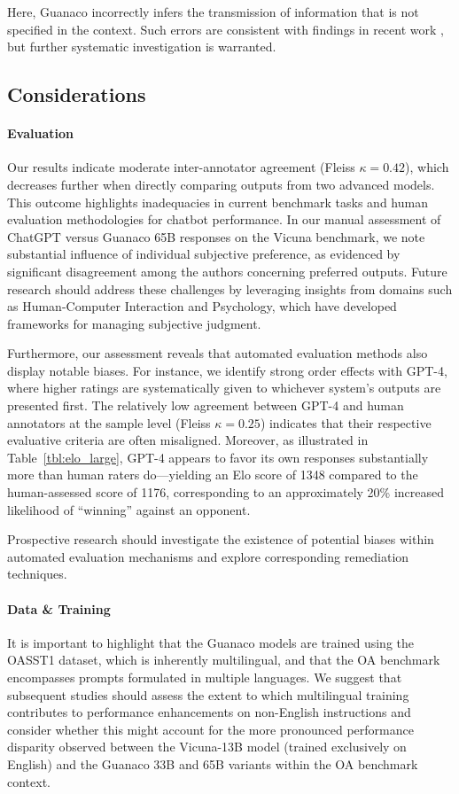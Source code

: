 Here, {Guanaco} incorrectly infers the transmission of information that is not specified in the context. Such errors are consistent with findings in recent work \cite{sap2022neural}, but further systematic investigation is warranted.

\subsection{Considerations}
\label{ssec:considerations}

\paragraph{Evaluation}

Our results indicate moderate inter-annotator agreement (Fleiss $\kappa=0.42$), which decreases further when directly comparing outputs from two advanced models. This outcome highlights inadequacies in current benchmark tasks and human evaluation methodologies for chatbot performance. In our manual assessment of ChatGPT versus {Guanaco} 65B responses on the Vicuna benchmark, we note substantial influence of individual subjective preference, as evidenced by significant disagreement among the authors concerning preferred outputs. Future research should address these challenges by leveraging insights from domains such as Human-Computer Interaction and Psychology, which have developed frameworks for managing subjective judgment.

Furthermore, our assessment reveals that automated evaluation methods also display notable biases. For instance, we identify strong order effects with GPT-4, where higher ratings are systematically given to whichever system’s outputs are presented first. The relatively low agreement between GPT-4 and human annotators at the sample level (Fleiss $\kappa=0.25$) indicates that their respective evaluative criteria are often misaligned. Moreover, as illustrated in Table~\ref{tbl:elo_large}, GPT-4 appears to favor its own responses substantially more than human raters do—yielding an Elo score of 1348 compared to the human-assessed score of 1176, corresponding to an approximately 20\% increased likelihood of “winning” against an opponent.

Prospective research should investigate the existence of potential biases within automated evaluation mechanisms and explore corresponding remediation techniques.

\paragraph{Data \& Training} It is important to highlight that the {Guanaco} models are trained using the OASST1 dataset, which is inherently multilingual, and that the OA benchmark encompasses prompts formulated in multiple languages. We suggest that subsequent studies should assess the extent to which multilingual training contributes to performance enhancements on non-English instructions and consider whether this might account for the more pronounced performance disparity observed between the Vicuna-13B model (trained exclusively on English) and the {Guanaco} 33B and 65B variants within the OA benchmark context.

